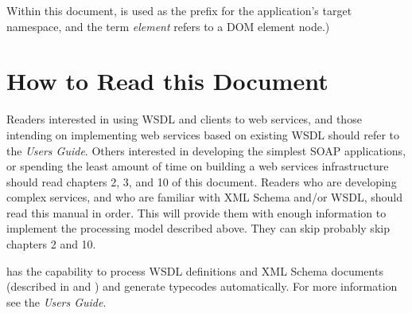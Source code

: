 Within this document,  is used as the prefix for the
application's target namespace, and the term
\emph{element} refers to a DOM element node.)

\section{How to Read this Document}

Readers interested in using WSDL and clients to web services, and those
intending on implementing web services based on existing WSDL should refer
to the \emph{Users Guide}.  Others interested in developing the simplest SOAP
applications, or spending the least amount of time on building a web services
infrastructure should read chapters 2, 3, and 10 of this document. Readers who
are developing complex services, and who are familiar with XML Schema and/or
WSDL, should read this manual in order. This will provide them with enough
information to implement the processing model described above.  They can skip
probably skip chapters 2 and 10.

\ZSI{} has the capability to process WSDL definitions and XML Schema documents
(described in  and )
and generate typecodes automatically.  For more information see the \emph{Users
Guide}.




